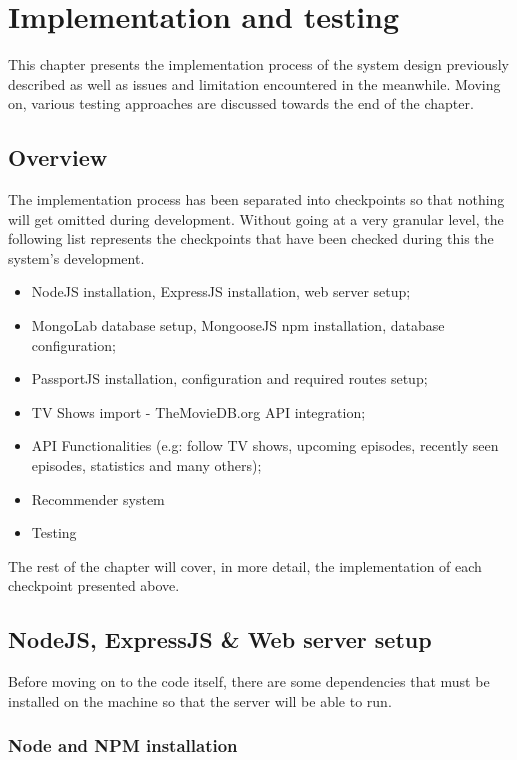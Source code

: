 \chapter{Implementation and testing}

This chapter presents the implementation process of the system design previously described as well as issues and limitation encountered in the meanwhile. Moving on, various testing approaches are discussed towards the end of the chapter.

\section{Overview}

The implementation process has been separated into checkpoints so that nothing will get omitted during development. Without going at a very granular level, the following list represents the checkpoints that have been checked during this the system's development.

\begin{itemize}
    \item NodeJS installation, ExpressJS installation, web server setup;
    \item MongoLab database setup, MongooseJS npm installation, database configuration;
    \item PassportJS installation, configuration and required routes setup;
    \item TV Shows import - TheMovieDB.org API integration;
    \item API Functionalities (e.g: follow TV shows, upcoming episodes, recently seen episodes, statistics and many others);
    \item Recommender system
    \item Testing
\end{itemize}

The rest of the chapter will cover, in more detail, the implementation of each checkpoint presented above.

\section{NodeJS, ExpressJS \& Web server setup}

Before moving on to the code itself, there are some dependencies that must be installed on the machine so that the server will be able to run.

\subsection{Node and NPM installation}

